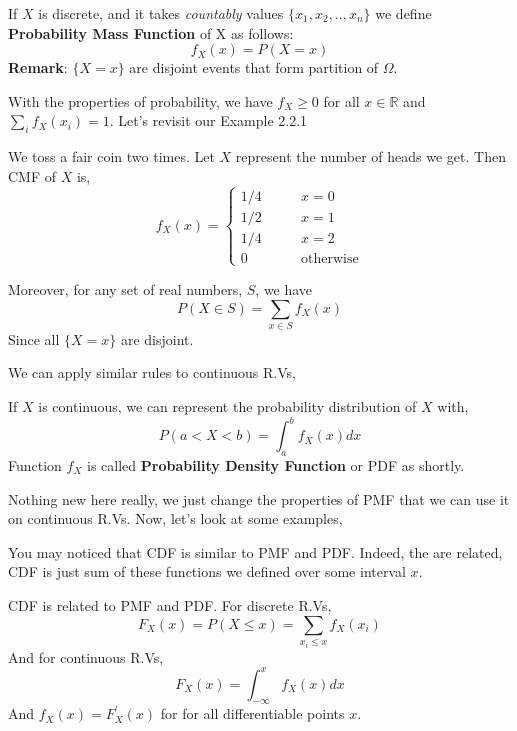 \begin{definition}
    If $X$ is discrete, and it takes \textit{countably} values $ \{ x_1,x_2,..,x_n \}$ we define \textbf{Probability Mass Function} of X as follows:
    $$f_X(x)= P(X = x)$$
    \textbf{Remark}: $ \{ X=x \} $ are disjoint events that form partition of $\Omega$.
\end{definition}

   With the properties of probability, we have $f_X \ge 0$ for all $x \in \mathbb{R}$ and $\sum_{i} f_X (x_i) =1 $. Let's revisit our Example 2.2.1

   \begin{example}
    We toss a fair coin two times. Let $X$ represent the number of heads we get. Then CMF of $X$ is,
    \[f_X(x) = 
        \begin{cases} 
          1/4 \qquad &x=0\\
          1/2 \qquad &x=1 \\
          1/4 \qquad &x=2\\
          0 \qquad &\text{otherwise}
        \end{cases} 
\]
\end{example}



Moreover, for any set of real numbers, $S$, we have
\[ P (X \in S) = \sum_{x \in S} f_X(x)\]
Since all $\{X = x \}$  are disjoint.\\
\par
We can apply similar rules to continuous R.Vs,
\begin{definition}
    If $X$ is continuous, we can represent the probability distribution of $X$ with,
    \[ P(a < X < b) = \int_{a}^{b} f_X(x) dx \]
    Function  $f_X$ is called \textbf{Probability Density Function} or PDF as shortly.
\end{definition}
Nothing new here really, we just change the properties of PMF that we can use it on continuous R.Vs. Now, let's look at some examples,\\
\par
You may noticed that CDF is similar to PMF and PDF. Indeed, the are related, CDF is just sum of these functions we defined over some interval $x$.
\begin{definition}
    CDF is related to PMF and PDF. For discrete R.Vs,
    \[F_X(x) = P(X \le x) = \sum_{x_i \le x} f_X(x_i)\]
    And for continuous R.Vs,
    \[F_X(x)= \int_{-\infty}^x f_X(x)dx \]
    And $f_X(x) = F_X^{'}(x)$ for for all differentiable points $x$.
\end{definition}
\par



